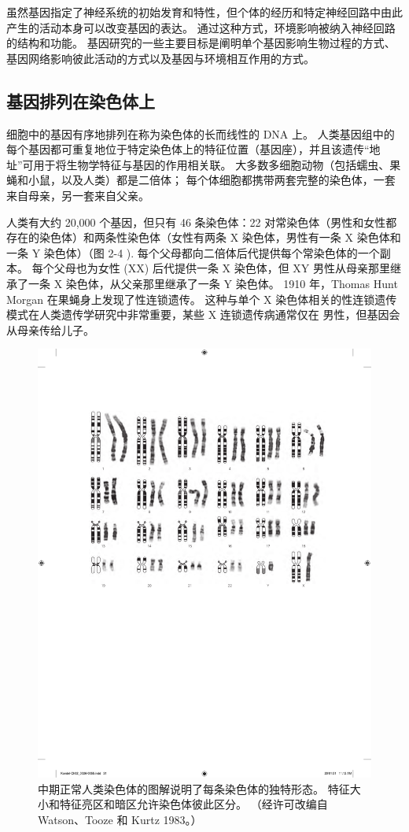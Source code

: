 虽然基因指定了神经系统的初始发育和特性，但个体的经历和特定神经回路中由此产生的活动本身可以改变基因的表达。 
通过这种方式，环境影响被纳入神经回路的结构和功能。
基因研究的一些主要目标是阐明单个基因影响生物过程的方式、基因网络影响彼此活动的方式以及基因与环境相互作用的方式。



\subsection{基因排列在染色体上}

细胞中的基因有序地排列在称为染色体的长而线性的 DNA 上。 
人类基因组中的每个基因都可重复地位于特定染色体上的特征位置（基因座），并且该遗传“地址”可用于将生物学特征与基因的作用相关联。 
大多数多细胞动物（包括蠕虫、果蝇和小鼠，以及人类）都是二倍体； 
每个体细胞都携带两套完整的染色体，一套来自母亲，另一套来自父亲。


人类有大约 20,000 个基因，但只有 46 条染色体：22 对常染色体（男性和女性都存在的染色体）和两条性染色体（女性有两条 X 染色体，男性有一条 X 染色体和一条 Y 染色体）（图 2-4 ). 每个父母都向二倍体后代提供每个常染色体的一个副本。 
每个父母也为女性 (XX) 后代提供一条 X 染色体，但 XY 男性从母亲那里继承了一条 X 染色体，从父亲那里继承了一条 Y 染色体。 
1910 年，Thomas Hunt Morgan 在果蝇身上发现了性连锁遗传。
这种与单个 X 染色体相关的性连锁遗传模式在人类遗传学研究中非常重要，某些 X 连锁遗传病通常仅在 男性，但基因会从母亲传给儿子。

\begin{figure}[htbp]
	\centering
	\includegraphics[width=0.5\linewidth]{chap02/fig_2_4}
	\caption{中期正常人类染色体的图解说明了每条染色体的独特形态。 
		特征大小和特征亮区和暗区允许染色体彼此区分。 
		（经许可改编自 Watson、Tooze 和 Kurtz 1983。）}
	\label{fig:2_4}
\end{figure}


